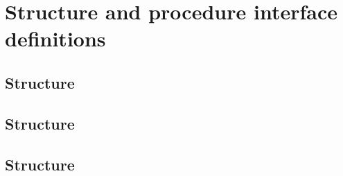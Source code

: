 \chapter{Structure and procedure interface definitions}
\label{sec:structure_and_interface_definition}



\clearpage
\section{\ChannelInfo{} Structure}
\label{sec:channelinfo_structure}


\clearpage










\clearpage
\section{\Atmosphere{} Structure}
\label{sec:atmosphere_structure}



\clearpage


















\newpage
\section{\Cloud{} Structure}
\label{sec:cloud_structure}



